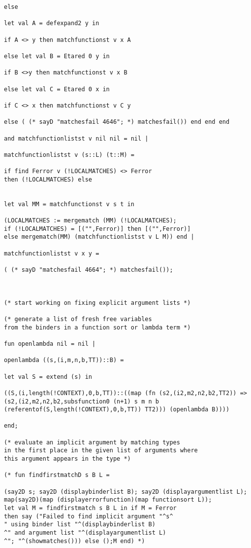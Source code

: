 \documentclass[12pt]{article}
\begin{document}
\begin{verbatim}
else 

let val A = defexpand2 y in 

if A <> y then matchfunctionst v x A

else let val B = Etared 0 y in

if B <>y then matchfunctionst v x B

else let val C = Etared 0 x in

if C <> x then matchfunctionst v C y

else ( (* sayD "matchesfail 4646"; *) matchesfail()) end end end

and matchfunctionlistst v nil nil = nil |

matchfunctionlistst v (s::L) (t::M) =

if find Ferror v (!LOCALMATCHES) <> Ferror 
then (!LOCALMATCHES) else


let val MM = matchfunctionst v s t in

(LOCALMATCHES := mergematch (MM) (!LOCALMATCHES);
if (!LOCALMATCHES) = [("",Ferror)] then [("",Ferror)]
else mergematch(MM) (matchfunctionlistst v L M)) end |

matchfunctionlistst v x y = 

( (* sayD "matchesfail 4664"; *) matchesfail());



(* start working on fixing explicit argument lists *)

(* generate a list of fresh free variables
from the binders in a function sort or lambda term *)

fun openlambda nil = nil |

openlambda ((s,(i,m,n,b,TT))::B) =

let val S = extend (s) in

((S,(i,length(!CONTEXT),0,b,TT))::((map (fn (s2,(i2,m2,n2,b2,TT2)) =>
(s2,(i2,m2,n2,b2,subsfunction0 (n+1) s m n b 
(referentof(S,length(!CONTEXT),0,b,TT)) TT2))) (openlambda B))))

end;

(* evaluate an implicit argument by matching types
in the first place in the given list of arguments where
this argument appears in the type *)

(* fun findfirstmatchD s B L =

(say2D s; say2D (displaybinderlist B); say2D (displayargumentlist L);
map(say2D)(map (displayerrorfunction)(map functionsort L));
let val M = findfirstmatch s B L in if M = Ferror 
then say ("Failed to find implicit argument "^s^
" using binder list "^(displaybinderlist B)
^" and argument list "^(displayargumentlist L)
^"; "^(showmatches())) else ();M end) *)


\end{verbatim}
\end{document}

